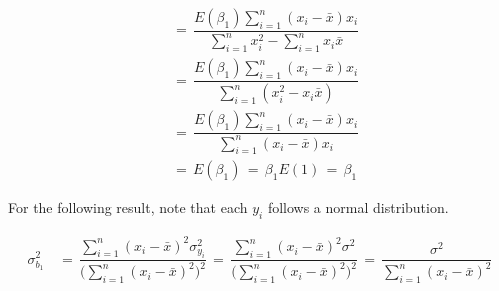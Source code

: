 \begin{align*}
    &= \hspace{2pt} \dfrac{E(\beta_{1})\sum_{i = 1}^{n} (x_{i} - \bar{x})x_{i}}{\sum_{i = 1}^{n} x_{i}^{2} - \sum_{i = 1}^{n} x_{i}\bar{x}} \\[1ex]
    &= \hspace{2pt} \dfrac{E(\beta_{1})\sum_{i = 1}^{n} (x_{i} - \bar{x})x_{i}}{\sum_{i = 1}^{n} (x_{i}^{2} - x_{i}\bar{x})} \\[1ex]
    &= \hspace{2pt} \dfrac{E(\beta_{1})\sum_{i = 1}^{n} (x_{i} - \bar{x})x_{i}}{\sum_{i = 1}^{n} (x_{i} - \bar{x})x_{i}} \\[1ex]
    &= \hspace{2pt} E(\beta_{1}) \hspace{2pt} = \hspace{2pt} \beta_{1}E(1) \hspace{2pt} = \hspace{2pt} \beta_{1}
\end{align*}

For the following result, note that each $y_{i}$ follows a normal distribution.

\begin{align*}
    \sigma_{b_{1}}^{2} \hspace{2pt} &= \hspace{2pt} \dfrac{\sum_{i = 1}^{n} (x_{i} - \bar{x})^{2} \sigma_{y_{i}}^{2}}{\Big(\sum_{i = 1}^{n} (x_{i} - \bar{x})^{2} \Big)^{2}} \hspace{2pt} = \hspace{2pt} \dfrac{\sum_{i = 1}^{n} (x_{i} - \bar{x})^{2} \sigma^{2}}{\Big(\sum_{i = 1}^{n} (x_{i} - \bar{x})^{2} \Big)^{2}} \hspace{2pt} = \hspace{2pt} \dfrac{\sigma^{2}}{\sum_{i = 1}^{n} (x_{i} - \bar{x})^{2}}
\end{align*}

